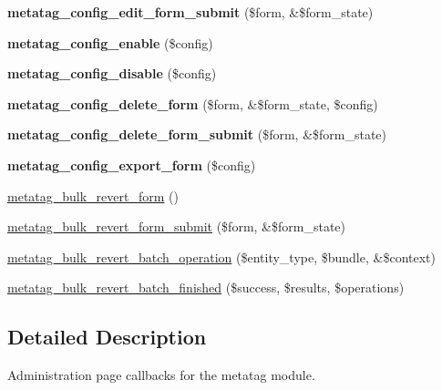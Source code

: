 \begin{DoxyCompactItemize}
\item 
\hypertarget{metatag_8admin_8inc_a0ecc81ff7c9547dd8c1ca7e2ec3325ac}{
{\bfseries metatag\_\-config\_\-edit\_\-form\_\-submit} (\$form, \&\$form\_\-state)}
\label{metatag_8admin_8inc_a0ecc81ff7c9547dd8c1ca7e2ec3325ac}

\item 
\hypertarget{metatag_8admin_8inc_a3d179de4ff83c2bbc898b8e3d6274f52}{
{\bfseries metatag\_\-config\_\-enable} (\$config)}
\label{metatag_8admin_8inc_a3d179de4ff83c2bbc898b8e3d6274f52}

\item 
\hypertarget{metatag_8admin_8inc_ad9363e69170b26a3644f4fe9604fb067}{
{\bfseries metatag\_\-config\_\-disable} (\$config)}
\label{metatag_8admin_8inc_ad9363e69170b26a3644f4fe9604fb067}

\item 
\hypertarget{metatag_8admin_8inc_a6c9a2da0a79fc88f9f525ee9051a4f40}{
{\bfseries metatag\_\-config\_\-delete\_\-form} (\$form, \&\$form\_\-state, \$config)}
\label{metatag_8admin_8inc_a6c9a2da0a79fc88f9f525ee9051a4f40}

\item 
\hypertarget{metatag_8admin_8inc_aaebba5a37610335c6107c3db4e5fdcfc}{
{\bfseries metatag\_\-config\_\-delete\_\-form\_\-submit} (\$form, \&\$form\_\-state)}
\label{metatag_8admin_8inc_aaebba5a37610335c6107c3db4e5fdcfc}

\item 
\hypertarget{metatag_8admin_8inc_a87a318e3837f3737d0326d6ccbd1c156}{
{\bfseries metatag\_\-config\_\-export\_\-form} (\$config)}
\label{metatag_8admin_8inc_a87a318e3837f3737d0326d6ccbd1c156}

\item 
\hyperlink{group__forms_ga73f02a09e1068de6e28ae97baa10a041}{metatag\_\-bulk\_\-revert\_\-form} ()
\item 
\hyperlink{metatag_8admin_8inc_a175595665a6d1fead2df7b214a3845d8}{metatag\_\-bulk\_\-revert\_\-form\_\-submit} (\$form, \&\$form\_\-state)
\item 
\hyperlink{metatag_8admin_8inc_a390b69e3ff58bff4a023797722f91314}{metatag\_\-bulk\_\-revert\_\-batch\_\-operation} (\$entity\_\-type, \$bundle, \&\$context)
\item 
\hyperlink{metatag_8admin_8inc_a3fae24225b7ba1a63a6317b49c147094}{metatag\_\-bulk\_\-revert\_\-batch\_\-finished} (\$success, \$results, \$operations)
\end{DoxyCompactItemize}


\subsection{Detailed Description}
Administration page callbacks for the metatag module. 

